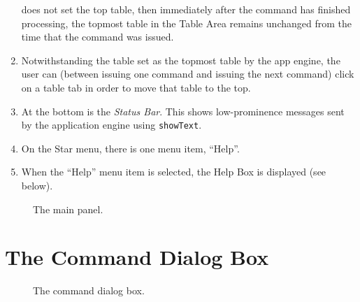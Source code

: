\documentclass[11pt]{article}
\begin{document}
\begin{enumerate}
  does not set the top table, then immediately
  after the command has finished processing, the topmost table in the
  Table Area remains unchanged from the time that the command was issued.
\item Notwithstanding the table set as the topmost table by the app
  engine, the user can (between issuing one command and issuing the
  next command) click on a table tab in order to move that table to
  the top.
\item At the bottom is the {\it Status Bar}.  This shows low-prominence
  messages sent by the application engine using {\tt showText}.
\item On the Star menu, there is one menu item, ``Help''.
\item When the ``Help'' menu item is selected, the Help Box is
  displayed (see below).
\end{enumerate}

\begin{figure}[t]

\centerline{}

\caption{
  The main panel.
}
\label{mainPanelFig}
\end{figure}


\section{The Command Dialog Box}

\begin{figure}

\centerline{\epsfxsize=5.5in }

\caption{
  The command dialog box.
}
\label{commandDialogBoxFig}
\end{figure}
\end{document}
